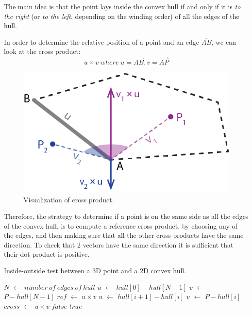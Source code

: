 \documentclass{PoliMi_MasterThesis}
\newcommand*\Let[2]{\State #1 $\gets$ #2}
\begin{document}
The main idea is that the point lays inside the convex hull if and only if it is \textit{to the right} (or \textit{to the left}, depending on the winding order) of all the edges of the hull.

In order to determine the relative position of a point and an edge $\overline{AB}$, we can look at the cross product:
$$u \times v \; where \; u = \overrightarrow{AB}, v = \overrightarrow{AP}$$

\begin{figure}[H]
    \centering
    \includegraphics[width=\textwidth*\real{0.45}]{Images/cross_product.png} 
    \caption{Visualization of cross product.}
    \label{fig:cross_product}
\end{figure}

Therefore, the strategy to determine if a point is on the same side as  all the edges of the convex hull, is to compute a reference cross product, by choosing any of the edges, and then making sure that all the other cross products have the same direction. To check that 2 vectors have the same direction it is sufficient that their dot product is positive.

\begin{algorithm}[H]
	\caption{Inside-outside test between a 3D point and a 2D convex hull.} 
	\begin{algorithmic}[1]
		\Let{$N$}{$number \: of \: edges \: of \: hull$}
		\Let{$u$}{$hull[0] - hull[N-1]$}
		\Let{$v$}{$P - hull[N-1]$}
		\Let{$ref$}{$u \times v$} 
			\Let{$u$}{$hull[i+1] - hull[i]$}
			\Let{$v$}{$P - hull[i]$}
			\Let{$cross$}{$u \times v$}
				\State \Return $false$
			\EndIf
		\EndFor
		\State \Return $true$
		\EndFunction
	\end{algorithmic}
\end{algorithm} 
\end{document}
